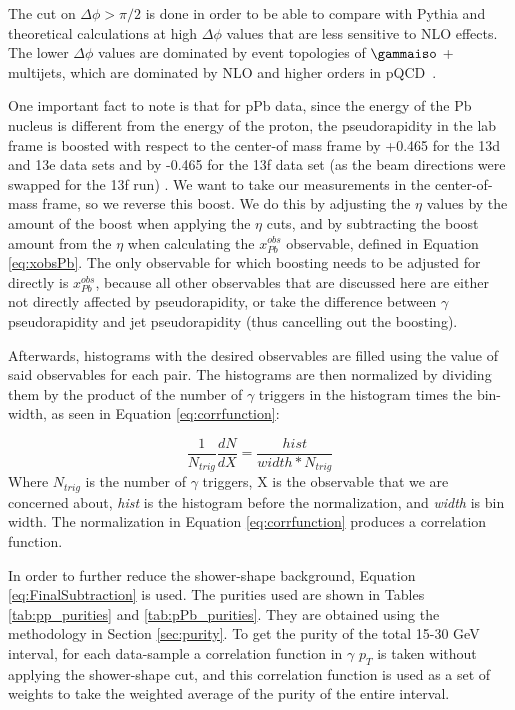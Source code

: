 The cut on $\Delta\phi>\pi/2$ is done in order to be able to compare with Pythia and theoretical calculations at high $\Delta\phi$ values that are less sensitive to NLO effects. The lower $\Delta\phi$ values are dominated by event topologies of $\gammaiso$ + multijets, which are dominated by NLO and higher orders in pQCD~\cite{Luo:2018pto}.

One important fact to note is that for pPb data, since the energy of the Pb nucleus is different from the energy of the proton, the pseudorapidity in the lab frame is boosted with respect to the center-of mass frame by +0.465 for the 13d and 13e data sets and by -0.465 for the 13f data set (as the beam directions were swapped for the 13f run) \cite{Adam:2015hoa}. We want to take our measurements in the center-of-mass frame, so we reverse this boost. We do this by adjusting the $\eta$ values by the amount of the boost when applying the $\eta$ cuts, and by subtracting the boost amount from the $\eta$ when calculating the $x^{obs}_{Pb}$ observable, defined in Equation \ref{eq:xobsPb}. The only observable for which boosting needs to be adjusted for directly is $x^{obs}_{Pb}$, because all other observables that are discussed here are either not directly affected by pseudorapidity, or take the difference between $\gamma$ pseudorapidity and jet pseudorapidity (thus cancelling out the boosting).


Afterwards, histograms with the desired observables are filled using the value of said observables for each pair. The histograms are then normalized by dividing them by the product of the number of $\gamma$ triggers in the histogram times the bin-width, as seen in Equation \ref{eq:corrfunction}:

\begin{equation}
    \frac{1}{N_{trig}}\frac{dN}{dX}=\frac{hist}{width*N_{trig}}
    \label{eq:corrfunction}
\end{equation}
Where $N_{trig}$ is the number of $\gamma$ triggers, X is the observable that we are concerned about, {\it hist} is the histogram before the normalization, and {\it width} is bin width. The normalization in Equation \ref{eq:corrfunction} produces a correlation function. 

In order to further reduce the shower-shape background, Equation \ref{eq:FinalSubtraction} is used. The purities used are shown in Tables \ref{tab:pp_purities} and \ref{tab:pPb_purities}. They are obtained using the methodology in Section \ref{sec:purity}. To get the purity of the total 15-30 GeV interval, for each data-sample a correlation function in $\gamma$ $p_T$ is taken without applying the shower-shape cut, and this correlation function is used as a set of weights to take the weighted average of the purity of the entire interval.

